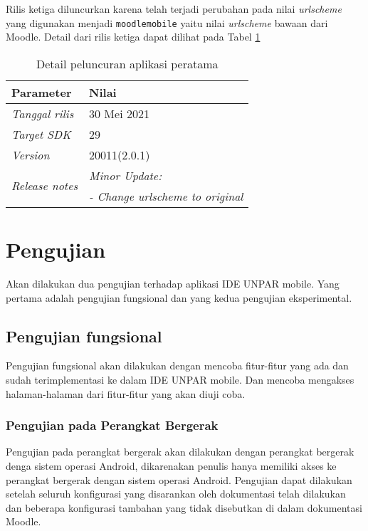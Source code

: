 Rilis ketiga diluncurkan karena telah terjadi perubahan pada nilai \textit{urlscheme} yang digunakan menjadi \texttt{moodlemobile} yaitu nilai \textit{urlscheme} bawaan dari Moodle. Detail dari rilis ketiga dapat dilihat pada Tabel \ref{app:release:third}

\begin{table}[H]
\caption{Detail peluncuran aplikasi peratama}
\centering
\begin{tabular}{|l | l |}
\hline
\textbf{Parameter} & \textbf{Nilai} \\  \hline
\textit{Tanggal rilis}  &  30  Mei 2021 \\ \hline
\textit{Target SDK} & 29 \\ \hline
\textit{Version} &  20011(2.0.1) \\ \hline
\multirow{2}{*}{\textit{Release notes}} &  \textit{Minor Update:} \\ & \textit{- Change urlscheme to original} \\ 
\hline
\end{tabular}
\label{app:release:third}
\end{table}

\section{Pengujian}

Akan dilakukan dua pengujian terhadap aplikasi IDE UNPAR mobile. Yang pertama adalah pengujian fungsional dan yang kedua pengujian eksperimental.

\subsection{Pengujian fungsional}
Pengujian fungsional akan dilakukan dengan mencoba fitur-fitur yang ada dan sudah terimplementasi ke dalam IDE UNPAR mobile. Dan mencoba mengakses halaman-halaman dari fitur-fitur yang akan diuji coba.

\subsubsection{Pengujian pada Perangkat Bergerak}
Pengujian pada perangkat bergerak akan dilakukan dengan perangkat bergerak denga sistem operasi Android, dikarenakan penulis hanya memiliki akses ke perangkat bergerak dengan sistem operasi Android. Pengujian dapat dilakukan setelah seluruh konfigurasi yang disarankan oleh dokumentasi telah dilakukan dan beberapa konfigurasi tambahan yang tidak disebutkan di dalam dokumentasi Moodle.

